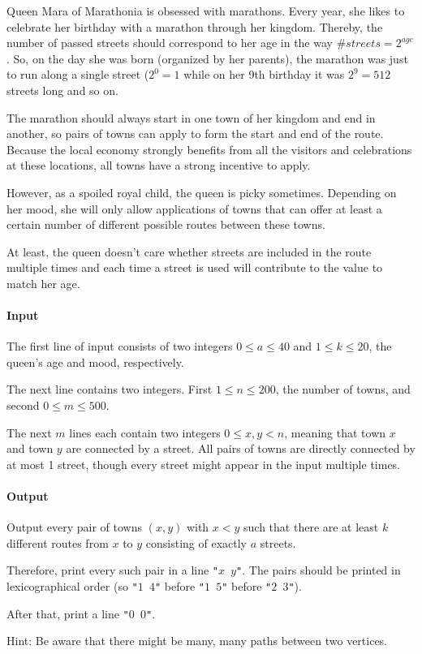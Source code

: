 




Queen Mara of Marathonia is obsessed with marathons. Every year, she likes to celebrate her birthday with a marathon through her kingdom. Thereby, the number of passed streets should correspond to her age in the way \(\#streets = 2^{age}\). So, on the day she was born (organized by her parents), the marathon was just to run along a single street (\(2^0=1\) while on her 9th birthday it was \(2^9=512\) streets long and so on.

The marathon should always start in one town of her kingdom and end in another, so pairs of towns can apply to form the start and end of the route. Because the local economy strongly benefits from all the visitors and celebrations at these locations, all towns have a strong incentive to apply.

However, as a spoiled royal child, the queen is picky sometimes. Depending on her mood, she will only allow applications of towns that can offer at least a certain number of different possible routes between these towns.

At least, the queen doesn't care whether streets are included in the route multiple times and each time a street is used will contribute to the value to match her age.

\paragraph*{Input}

The first line of input consists of two integers \(0\le a \le 40\) and \(1\le k \le 20\), the queen's age and mood, respectively.

The next line contains two integers. First \(1 \le n \le 200\), the number of towns, and second \(0\le m \le 500\). 

The next \(m\) lines each contain two integers \(0 \le x,y < n\), meaning that town \(x\) and town \(y\) are connected by a street. All pairs of towns are directly connected by at most 1 street, though every street might appear in the input multiple times.

\paragraph*{Output}
Output every pair of towns \((x,y)\) with \(x < y\) such that there are at least \(k\) different routes from \(x\) to \(y\) consisting of exactly \(a\) streets.

Therefore, print every such pair in a line \texttt{"\(x\) \(y\)"}. The pairs should be printed in lexicographical order (so \texttt{"\(1\) \(4\)"} before \texttt{"\(1\) \(5\)"} before \texttt{"\(2\) \(3\)"}).

After that, print a line \texttt{"\(0\) \(0\)"}.

Hint: Be aware that there might be many, many paths between two vertices.

\begin{samples}
\end{samples}

